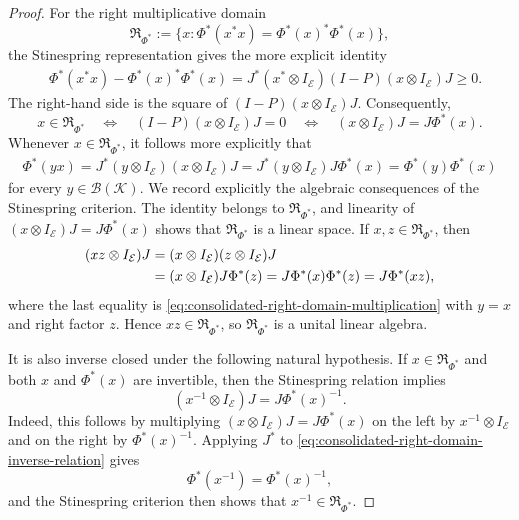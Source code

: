 \documentclass[11pt]{article}
\theoremstyle{remark}
\newcommand{\1}{\mathbbm{1}}
\begin{document}
\begin{proof}
For the right
multiplicative domain
\begin{equation}
\mathfrak R_{\Phi^*}
:=\{x:\Phi^*(x^*x)=\Phi^*(x)^*\Phi^*(x)\},
\end{equation}
the Stinespring representation gives the more explicit identity
\begin{align}
 &\Phi^*(x^*x)-\Phi^*(x)^*\Phi^*(x)
 =J^*(x^*\otimes I_{\mathcal E})(I-P)
       (x\otimes I_{\mathcal E})J\geq0.
 \label{eq:consolidated-right-domain-Stinespring-defect}
\end{align}
The right-hand side is the square of
$(I-P)(x\otimes I_{\mathcal E})J$.  Consequently,
\begin{equation}
 x\in\mathfrak R_{\Phi^*}
 \quad\Longleftrightarrow\quad
 (I-P)(x\otimes I_{\mathcal E})J=0
 \quad\Longleftrightarrow\quad
 (x\otimes I_{\mathcal E})J=J\Phi^*(x).
\end{equation}
Whenever $x\in\mathfrak R_{\Phi^*}$, it follows more explicitly that
\begin{align}
 \Phi^*(yx)
 =J^*(y\otimes I_{\mathcal E})(x\otimes I_{\mathcal E})J
 =J^*(y\otimes I_{\mathcal E})J\Phi^*(x)
 =\Phi^*(y)\Phi^*(x)
 \label{eq:consolidated-right-domain-multiplication}
\end{align}
for every $y\in\mathcal B(\mathcal K)$.
We record explicitly the algebraic consequences of the Stinespring
criterion.  The identity belongs to $\mathfrak R_{\Phi^*}$, and
linearity of
$(x\otimes I_{\mathcal E})J=J\Phi^*(x)$ shows that
$\mathfrak R_{\Phi^*}$ is a linear space.  If
$x,z\in\mathfrak R_{\Phi^*}$, then
\begin{align}
 (xz\otimes I_{\mathcal E})J
 &=(x\otimes I_{\mathcal E})(z\otimes I_{\mathcal E})J\notag\\
 &=(x\otimes I_{\mathcal E})J\Phi^*(z)
  =J\Phi^*(x)\Phi^*(z)
  =J\Phi^*(xz),
 \label{eq:consolidated-right-domain-product}
\end{align}
where the last equality is
\eqref{eq:consolidated-right-domain-multiplication} with $y=x$ and
right factor $z$.  Hence $xz\in\mathfrak R_{\Phi^*}$, so
$\mathfrak R_{\Phi^*}$ is a unital linear algebra.

It is also inverse closed under the following natural hypothesis.  If
$x\in\mathfrak R_{\Phi^*}$ and both $x$ and $\Phi^*(x)$ are
invertible, then the Stinespring relation implies
\begin{equation}
 (x^{-1}\otimes I_{\mathcal E})J
 =J\Phi^*(x)^{-1}.
 \label{eq:consolidated-right-domain-inverse-relation}
\end{equation}
Indeed, this follows by multiplying
$(x\otimes I_{\mathcal E})J=J\Phi^*(x)$ on the left by
$x^{-1}\otimes I_{\mathcal E}$ and on the right by
$\Phi^*(x)^{-1}$.  Applying $J^*$ to
\eqref{eq:consolidated-right-domain-inverse-relation} gives
\begin{equation}
 \Phi^*(x^{-1})=\Phi^*(x)^{-1},
\end{equation}
and the Stinespring criterion then shows that
$x^{-1}\in\mathfrak R_{\Phi^*}$.


\end{proof}
\end{document}
